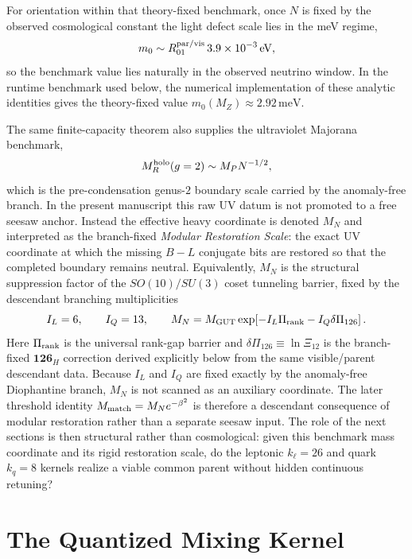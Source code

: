 \documentclass[11pt]{article}
\begin{document}
For orientation within that theory-fixed benchmark, once $N$ is fixed by the observed cosmological constant the light defect scale lies in the meV regime,
\begin{equation}
 m_0 \sim R_{01}^{\rm par/vis}\,3.9\times10^{-3}\,\mathrm{eV},
\end{equation}
so the benchmark value lies naturally in the observed neutrino window. In the runtime benchmark used below, the numerical implementation of these analytic identities gives the theory-fixed value $m_0(M_Z)\approx2.92\,\mathrm{meV}$.

The same finite-capacity theorem also supplies the ultraviolet Majorana benchmark,
\begin{equation}
 M_R^{\rm holo}(g=2) \sim M_PN^{-1/2},
\end{equation}
which is the pre-condensation genus-$2$ boundary scale carried by the anomaly-free branch. In the present manuscript this raw UV datum is not promoted to a free seesaw anchor. Instead the effective heavy coordinate is denoted $M_N$ and interpreted as the branch-fixed \emph{Modular Restoration Scale}: the exact UV coordinate at which the missing $B-L$ conjugate bits are restored so that the completed boundary remains neutral. Equivalently, $M_N$ is the structural suppression factor of the $SO(10)/SU(3)$ coset tunneling barrier, fixed by the descendant branching multiplicities
\begin{equation}
\label{eq:mass-hierarchy-modular-restoration}
 I_L=6,
 \qquad
 I_Q=13,
 \qquad
 M_N
 =
 M_{\rm GUT}\exp\!\left[-I_L\Pi_{\rm rank}-I_Q\delta\Pi_{126}\right].
\end{equation}
Here $\Pi_{\rm rank}$ is the universal rank-gap barrier and $\delta\Pi_{126}\equiv\ln\Xi_{12}$ is the branch-fixed $\mathbf{126}_H$ correction derived explicitly below from the same visible/parent descendant data. Because $I_L$ and $I_Q$ are fixed exactly by the anomaly-free Diophantine branch, $M_N$ is not scanned as an auxiliary coordinate. The later threshold identity $M_{\rm match}=M_Ne^{-\beta^2}$ is therefore a descendant consequence of modular restoration rather than a separate seesaw input. The role of the next sections is then structural rather than cosmological: given this benchmark mass coordinate and its rigid restoration scale, do the leptonic $k_{\ell}=26$ and quark $k_q=8$ kernels realize a viable common parent without hidden continuous retuning?

\section{The Quantized Mixing Kernel}\label{sec:quantized-mixing-kernel}
\end{document}
